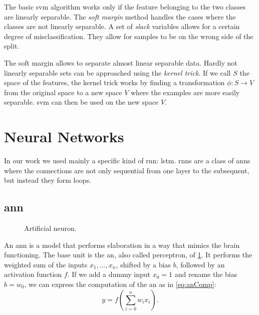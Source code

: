 The basic \ac{svm} algorithm works only if the feature belonging to
the two classes are linearly separable. The \emph{soft margin} method
handles the cases where the classes are not linearly separable. A set
of \emph{slack} variables allows for a certain degree of
misclassification. They allow for samples to be on the wrong side of
the split.

The soft margin allows to separate almost linear separable
data. Hardly not linearly separable sets can be approached using the
\emph{kernel trick}. If we call $S$ the space of the features, the
kernel trick works by finding a transformation $\phi:S\rightarrow V$
from the original space to a new space $V$ where the examples are more
easily separable. \ac{svm} can then be used on the new space $V$.

\section{Neural Networks}
In our work we used mainly a specific kind of \ac{rnn}: \ac{lstm}.
\acp{rnn} are a class of \acp{ann} where the connections are not only
sequential from one layer to the subsequent, but instead they form
loops. 

\subsection{\acf{ann}}
\begin{figure}
  \centering
  \caption{Artificial neuron.}
  \label{fig:neuron}
\end{figure}
An \ac{ann} is a model that performs elaboration in a way that
mimics the brain functioning. The base unit is the \ac{an}, also called
perceptron, of
\cref{fig:neuron}. It performs the weighted sum of the inputs
$x_1,\dots,x_n$, shifted by a bias $b$, followed by an activation
function $f$. If we add a dummy input $x_0=1$ and rename the bias
$b=w_0$, we can express the computation of the \ac{an} as in
\cref{eq:anComp}:
\begin{equation}\label{eq:anComp}
  y = f(\sum_{i=0}^n w_i x_i).
\end{equation}

